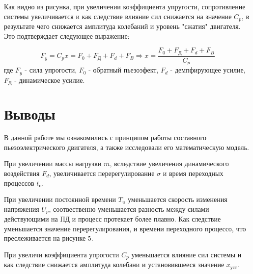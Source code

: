 \documentclass[a4paper, 12pt]{article}
\begin{document}
Как видно из рисунка, при увеличении коэффициента упругости, сопротивление системы увеличивается и как следствие влияние сил снижается на значение $C_p$, в результате чего снижается амплитуда колебаний и уровень "сжатия" двигателя. Это подтверждает следующее выражение:

\begin{equation*}
   F_y = C_px = F_0 + F_\text{Д} + F_d + F_B \Rightarrow x = \frac{F_0 + F_\text{Д} + F_d + F_B}{C_p}
\end{equation*}
где $F_y$ - сила упрогости, $F_0$ - обратный пьезоэфект, $F_d$ - демпфирующее усилие, $F_\text{Д}$ - динамическое усилие.

\newpage
\section*{\centering Выводы}
В данной работе мы ознакомились с принципом работы составного пьезоэлектрического двигателя, а также исследовали его математическую модель.\par
При увеличении массы нагрузки $m$, вследствие увеличения динамического воздействия $F_d$, увеличивается перерегулирование $\sigma$ и время переходных процессов $t_\text{п}$. \par
При увеличении постоянной времени $T_u$ уменьшается скорость изменения напряжения $U_p$, соотвественно уменьшается разность между силами действующими на ПД и процесс протекает более плавно. Как следствие уменьшается значение перерегулирования, и времени переходного процессо, что преслеживается на рисунке 5. \par
При увеличи коэффициента упрогости $C_p$ уменьшается влияние сил системы и как следствие снижается амплитуда колебани и установившееся значение $x_\text{уст}$. 
\end{document}
